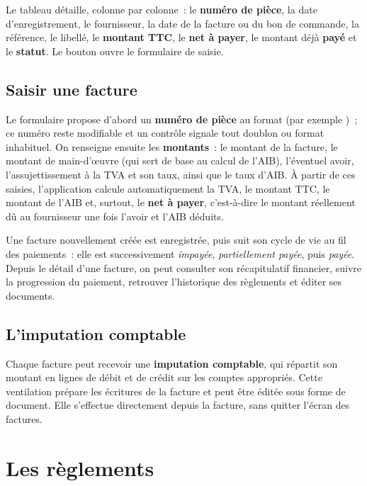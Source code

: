 Le tableau détaille, colonne par colonne~: le \textbf{numéro de pièce}, la date d'enregistrement, le fournisseur, la date de la facture ou du bon de commande, la référence, le libellé, le \textbf{montant TTC}, le \textbf{net à payer}, le montant déjà \textbf{payé} et le \textbf{statut}. Le bouton  ouvre le formulaire de saisie.


\section{Saisir une facture}
Le formulaire propose d'abord un \textbf{numéro de pièce} au format  (par exemple )~; ce numéro reste modifiable et un contrôle signale tout doublon ou format inhabituel. On renseigne ensuite les \textbf{montants}~: le montant de la facture, le montant de main-d'œuvre (qui sert de base au calcul de l'AIB), l'éventuel avoir, l'assujettissement à la TVA et son taux, ainsi que le taux d'AIB. À partir de ces saisies, l'application calcule automatiquement la TVA, le montant TTC, le montant de l'AIB et, surtout, le \textbf{net à payer}, c'est-à-dire le montant réellement dû au fournisseur une fois l'avoir et l'AIB déduits.

Une facture nouvellement créée est enregistrée, puis suit son cycle de vie au fil des paiements~: elle est successivement \emph{impayée}, \emph{partiellement payée}, puis \emph{payée}. Depuis le détail d'une facture, on peut consulter son récapitulatif financier, suivre la progression du paiement, retrouver l'historique des règlements et éditer ses documents.

\section{L'imputation comptable}
Chaque facture peut recevoir une \textbf{imputation comptable}, qui répartit son montant en lignes de débit et de crédit sur les comptes appropriés. Cette ventilation prépare les écritures de la facture et peut être éditée sous forme de document. Elle s'effectue directement depuis la facture, sans quitter l'écran des factures.

\chapter{Les règlements}

